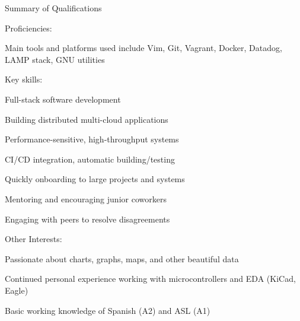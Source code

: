 \documentclass[letterpaper,10pt]{article}
\begin{document}
\begin{rsection}{Summary of Qualifications}
\begin{rsubitems}{Proficiencies:}
    \item Main tools and platforms used include Vim, Git, Vagrant, Docker, Datadog, LAMP stack, GNU utilities
  \end{rsubitems}
  \begin{rsubitems}{Key skills:}
    \item Full-stack software development
    \item Building distributed multi-cloud applications
    \item Performance-sensitive, high-throughput systems
    \item CI/CD integration, automatic building/testing
    \item Quickly onboarding to large projects and systems
    \item Mentoring and encouraging junior coworkers
    \item Engaging with peers to resolve disagreements
  \end{rsubitems}
  \begin{rsubitems}{Other Interests:}
    \item Passionate about charts, graphs, maps, and other beautiful data\\
    \item Continued personal experience working with microcontrollers and EDA (KiCad, Eagle)
    \item Basic working knowledge of Spanish (A2) and ASL (A1)
  \end{rsubitems}
\end{rsection}
\end{document}

